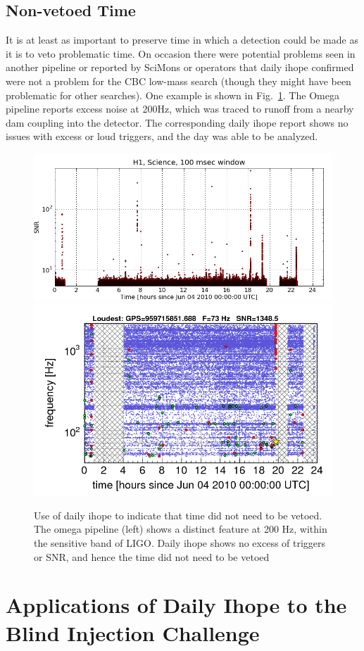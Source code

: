 \subsection{Non-vetoed Time}

It is at least as important to preserve time in which a detection
could be made as it is to veto problematic time.  On occasion there
were potential problems seen in another pipeline or reported by
SciMons or operators that daily ihope confirmed were not a problem for
the CBC low-mass search (though they might have been problematic for
other searches).  One example is shown in
Fig.~\ref{f:non_vetoed_time}.  The Omega pipeline reports excess
noise at 200Hz, which was traced to runoff from a nearby dam coupling
into the detector.  The corresponding daily ihope report shows no
issues with excess or loud triggers, and the day was able to be
analyzed.

\begin{figure}
  \includegraphics[width=0.5\linewidth]{figures/detchar/20100604_H1_0_100MILLISEC_CLUSTERED_snr_vs_time}
  \includegraphics[width=0.5\linewidth]{figures/detchar/S6-H1-omega-959644815-959731215-GlitchTS}
  \caption[Use of daily ihope to indicate no veto needed] {
  \label{f:non_vetoed_time}
Use of daily ihope to indicate that time did not need to be vetoed.
The omega pipeline (left) shows a distinct feature at 200 Hz, within
the sensitive band of LIGO.  Daily ihope shows no excess of triggers
or SNR, and hence the time did not need to be vetoed}
\end{figure}%


\section{Applications of Daily Ihope to the Blind Injection Challenge}
\label{sec:applications_dog}

